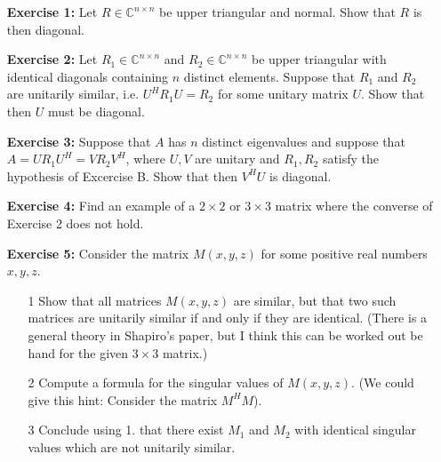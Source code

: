 \documentclass[14pt]{report}
\begin{document}
\begin{enumerate}
  \item[\textbf{Exercise 1:}] Let $R\in\mathbb{C}^{n\times n}$ be upper 
    triangular and normal. Show that $R$ is then diagonal. 

  \item[\textbf{Exercise 2:}] Let $R_1\in\mathbb{C}^{n\times n}$ and
    $R_2\in\mathbb{C}^{n\times n}$ be upper triangular with identical diagonals
    containing $n$ distinct elements. Suppose that $R_1$ and $R_2$ are 
    unitarily similar, i.e. $U^HR_1U = R_2$ for some unitary matrix $U$.
    Show that then $U$ must be diagonal.

  \item[\textbf{Exercise 3:}] Suppose that $A$ has $n$ distinct eigenvalues and
    suppose that $A = U R_1 U^H = V R_2 V^H$, where $U,V$ are unitary and 
    $R_1, R_2$ satisfy the hypothesis of Excercise B. Show that then $V^H U$ is
    diagonal.

  \item[\textbf{Exercise 4:}] Find an example of a $2\times2$ or $3\times3$
    matrix where the converse of Exercise 2 does not hold.

  \item[\textbf{Exercise 5:}] Consider the matrix $M(x,y,z)$ for some positive
    real numbers $x,y,z$.
    \begin{enumerate}
      \item[1] Show that all matrices $M(x,y,z)$ are similar, but that two such
        matrices are unitarily similar if and only if they are identical.
        (There is a general theory in Shapiro's paper, but I think this can be
        worked out be hand for the given $3\times3$ matrix.)
      \item[2] Compute a formula for the singular values of $M(x,y,z)$. 
        (We could give this hint: Consider the matrix $M^H M$).
      \item[3] Conclude using 1. that there exist $M_1$ and $M_2$ with
        identical singular values which are not unitarily similar.
      \end{enumerate}
  

\end{enumerate}
\end{document}
